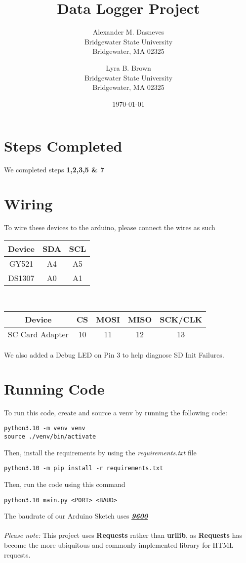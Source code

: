 \documentclass{article}
\title{Data Logger Project}
\author{Alexander M. Dasneves\\Bridgewater State University\\Bridgewater, MA 02325\and Lyra B. Brown\\Bridgewater State University\\Bridgewater, MA 02325}
\date{\today}
\begin{document}
  \maketitle

  \section*{Steps Completed}
  \noindent
  We completed steps \textbf{1,2,3,5 \& 7}
  
  \section*{Wiring}
  \noindent
  To wire these devices to the arduino, please connect the wires as such\\
  \begin{tabular}{|c|c|c|}
    \hline
    Device&SDA&SCL\\
    \hline
    GY521&A4&A5\\
    DS1307&A0&A1\\
    \hline
  \end{tabular}
  \vspace{0.1in}
  \\
  \noindent
  \begin{tabular}{|c|c|c|c|c|}
    \hline
    Device&CS&MOSI&MISO&SCK/CLK\\
    \hline
    SC Card Adapter & 10 & 11 & 12 & 13\\
    \hline
  \end{tabular}
  We also added a Debug LED on Pin 3 to help diagnose SD Init Failures.

  \section*{Running Code}
  \noindent
  To run this code, create and source a venv by running the following code:\\
  \begin{verbatim}
python3.10 -m venv venv
source ./venv/bin/activate
  \end{verbatim}
  Then, install the requirements by using the \textit{requirements.txt} file\\
  \begin{verbatim}
python3.10 -m pip install -r requirements.txt
  \end{verbatim}
  Then, run the code using this command\\
  \begin{verbatim}
python3.10 main.py <PORT> <BAUD>
  \end{verbatim}
  The baudrate of our Arduino Sketch uses \textbf{\textit{\underline{9600}}}\\
  \\
  \textit{Please note:} This project uses \textbf{Requests} rather than \textbf{urllib}, as \textbf{Requests} has become the more ubiquitous and commonly implemented library for HTML requests.
\end{document}
